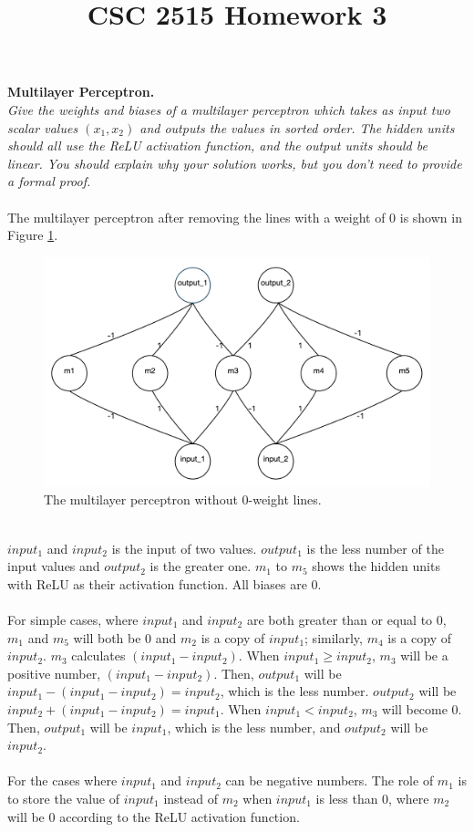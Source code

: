 \documentclass{myhw}
\title{CSC 2515 Homework 3}
\begin{document}
\begin{homeworkProblem}
\textbf{Multilayer Perceptron.} \\
\emph{Give the weights and biases of a multilayer perceptron which takes as input two scalar values $(x_1,x_2)$ and outputs the values in sorted order. The hidden units should all use the ReLU activation function, and the output units should be linear. You should explain why your solution works, but you don’t need to provide a formal proof.} \\
\\
The multilayer perceptron after removing the lines with a weight of 0 is shown in Figure \ref{fig:q1.1}. 
\begin{figure}[h]
  \centering
  \includegraphics[width=.5\textwidth]{q1.2.png} 
  \caption{The multilayer perceptron without 0-weight lines. }
  \label{fig:q1.1}
\end{figure}
\\
$input_1$ and $input_2$ is the input of two values. $output_1$ is the less number of the input values and $output_2$ is the greater one.
$m_1$ to $m_5$ shows the hidden units with ReLU as their activation function. All biases are 0.
\\
\\
For simple cases, where $input_1$ and $input_2$ are both greater than or equal to 0, $m_1$ and $m_5$ will both be 0 and $m_2$ is a copy of $input_1$; similarly, $m_4$ is a copy of $input_2$. $m_3$ calculates $(input_1 - input_2)$. When $input_1 \ge input_2$, $m_3$ will be a positive number, $(input_1 - input_2)$. Then, $output_1$ will be $input_1 - (input_1 - input_2) = input_2$, which is the less number. $output_2$ will be $input_2 + (input_1 - input_2) = input_1$. When $input_1 < input_2$, $m_3$ will become 0. Then, $output_1$ will be $input_1$, which is the less number, and $output_2$ will be $input_2$.
\\
\\
For the cases where $input_1$ and $input_2$ can be negative numbers. The role of $m_1$ is to store the value of $input_1$ instead of $m_2$ when $input_1$ is less than 0, where $m_2$ will be 0 according to the ReLU activation function.

\end{homeworkProblem}
\end{document}
